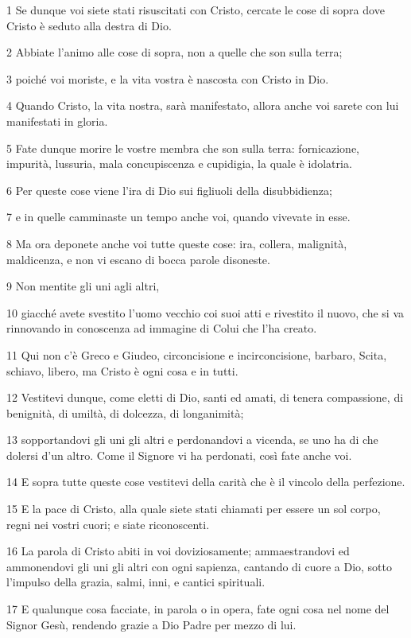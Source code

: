 \par 1 Se dunque voi siete stati risuscitati con Cristo, cercate le cose di sopra dove Cristo è seduto alla destra di Dio.
\par 2 Abbiate l'animo alle cose di sopra, non a quelle che son sulla terra;
\par 3 poiché voi moriste, e la vita vostra è nascosta con Cristo in Dio.
\par 4 Quando Cristo, la vita nostra, sarà manifestato, allora anche voi sarete con lui manifestati in gloria.
\par 5 Fate dunque morire le vostre membra che son sulla terra: fornicazione, impurità, lussuria, mala concupiscenza e cupidigia, la quale è idolatria.
\par 6 Per queste cose viene l'ira di Dio sui figliuoli della disubbidienza;
\par 7 e in quelle camminaste un tempo anche voi, quando vivevate in esse.
\par 8 Ma ora deponete anche voi tutte queste cose: ira, collera, malignità, maldicenza, e non vi escano di bocca parole disoneste.
\par 9 Non mentite gli uni agli altri,
\par 10 giacché avete svestito l'uomo vecchio coi suoi atti e rivestito il nuovo, che si va rinnovando in conoscenza ad immagine di Colui che l'ha creato.
\par 11 Qui non c'è Greco e Giudeo, circoncisione e incirconcisione, barbaro, Scita, schiavo, libero, ma Cristo è ogni cosa e in tutti.
\par 12 Vestitevi dunque, come eletti di Dio, santi ed amati, di tenera compassione, di benignità, di umiltà, di dolcezza, di longanimità;
\par 13 sopportandovi gli uni gli altri e perdonandovi a vicenda, se uno ha di che dolersi d'un altro. Come il Signore vi ha perdonati, così fate anche voi.
\par 14 E sopra tutte queste cose vestitevi della carità che è il vincolo della perfezione.
\par 15 E la pace di Cristo, alla quale siete stati chiamati per essere un sol corpo, regni nei vostri cuori; e siate riconoscenti.
\par 16 La parola di Cristo abiti in voi doviziosamente; ammaestrandovi ed ammonendovi gli uni gli altri con ogni sapienza, cantando di cuore a Dio, sotto l'impulso della grazia, salmi, inni, e cantici spirituali.
\par 17 E qualunque cosa facciate, in parola o in opera, fate ogni cosa nel nome del Signor Gesù, rendendo grazie a Dio Padre per mezzo di lui.
